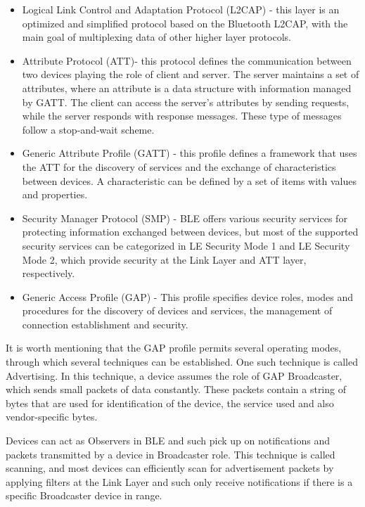 \begin{itemize}

\item{Logical Link Control and Adaptation Protocol (L2CAP) - this layer is an optimized and simplified protocol based on the Bluetooth L2CAP, with the main goal of multiplexing data of other higher layer protocols.}

\item{Attribute Protocol (ATT)- this protocol defines the communication between two devices playing the role of client and server. The server maintains a set of attributes, where an attribute is a data structure with information managed by GATT. The client can access the server's attributes by sending requests, while the server responds with response messages. These type of messages follow a stop-and-wait scheme.}

\item{Generic Attribute Profile (GATT) - this profile defines a framework that uses the ATT for the discovery of services and the exchange of characteristics between devices. A characteristic can be defined by a set of items with values and properties.}

\item{Security Manager Protocol (SMP) - BLE offers various security services for protecting information exchanged between devices, but most of the supported security services can be categorized in LE Security Mode 1 and LE Security Mode 2, which provide security at the Link Layer and ATT layer, respectively.}

\item{Generic Access Profile (GAP) - This profile specifies device roles, modes and procedures for the discovery of devices and services, the management of connection establishment and security.}

\end{itemize}

It is worth mentioning that the GAP profile permits several operating modes, through which several techniques can be established. One such technique is called Advertising. In this technique, a device assumes the role of GAP Broadcaster, which sends small packets of data constantly. These packets contain a string of bytes that are used for identification of the device, the service used and also vendor-specific bytes.

Devices can act as Observers in BLE and such pick up on notifications and packets transmitted by a device in Broadcaster role. This technique is called scanning, and most devices can efficiently scan for advertisement packets by applying filters at the Link Layer and such only receive notifications if there is a specific Broadcaster device in range.

